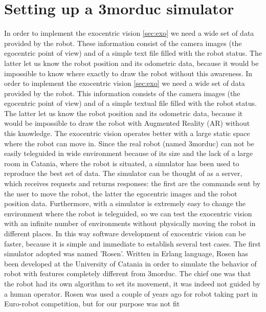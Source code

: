 \section{Setting up a 3morduc simulator}
\label{sec:simulator}
In order to implement the exocentric vision \ref{sec:exo} 
we need a wide set of data provided by the robot.
These information consist of the camera images 
(the egocentric point of view) and of a simple 
text file filled with the robot status. The latter 
let us know the robot position and its odometric 
data, because it would be impossible to know where 
exactly to draw the robot without this awareness.
%
In order to implement the exocentric vision \ref{sec:exo} we need a wide set of data provided by the robot.
This information consists of the camera images (the egocentric point of view) and of a simple textual file filled with 
the robot status. The latter let us know the robot position and its odometric data, because it would be impossible to draw 
the robot with Augmented Reality (AR) without this knowledge.
\newline The exocentric vision operates better with a large static space where the robot can move in. Since the real robot 
(named 3morduc) can not be easily teleguided in wide environment because of its size and the lack of a large room in Catania, 
where the robot is situated, a simulator has been used to reproduce the best set of data. The simulator can be thought of as 
a server, which receives requests and returns responses: the first are the commands sent by the user to move the robot, the
latter the egocentric images and the robot position data.
\newline Furthermore, with a simulator is extremely easy to change the environment where the robot is teleguided, so we can test
the exocentric vision with an infinite number of environments without physically moving the robot in different places. In this way
software development of exocentric vision can be faster, because it is simple and immediate to establish several test cases.
\newline The first simulator adopted was named 'Rosen'. Written in Erlang language, Rosen has been developed at the University
of Catania in order to simulate the behavior of robot with features completely different from 3morduc. The chief one was that
the robot had its own algorithm to set its movement, it was indeed not guided by a human operator.
\newline Rosen was used a couple of years ago for robot taking part in Euro-robot competition, but for our purpose was not fit
